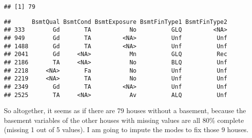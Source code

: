 \documentclass[]{article}
\newenvironment{Shaded}{\begin{snugshade}}{\end{snugshade}}
\newcommand{\CommentTok}[1]{\textcolor[rgb]{0.56,0.35,0.01}{\textit{#1}}}
\newcommand{\KeywordTok}[1]{\textcolor[rgb]{0.13,0.29,0.53}{\textbf{#1}}}
\newcommand{\NormalTok}[1]{#1}
\newcommand{\OperatorTok}[1]{\textcolor[rgb]{0.81,0.36,0.00}{\textbf{#1}}}
\newcommand{\StringTok}[1]{\textcolor[rgb]{0.31,0.60,0.02}{#1}}
\begin{document}
\begin{verbatim}
## [1] 79
\end{verbatim}

\begin{Shaded}
\end{Shaded}

\begin{verbatim}
##      BsmtQual BsmtCond BsmtExposure BsmtFinType1 BsmtFinType2
## 333        Gd       TA           No          GLQ         <NA>
## 949        Gd       TA         <NA>          Unf          Unf
## 1488       Gd       TA         <NA>          Unf          Unf
## 2041       Gd     <NA>           Mn          GLQ          Rec
## 2186       TA     <NA>           No          BLQ          Unf
## 2218     <NA>       Fa           No          Unf          Unf
## 2219     <NA>       TA           No          Unf          Unf
## 2349       Gd       TA         <NA>          Unf          Unf
## 2525       TA     <NA>           Av          ALQ          Unf
\end{verbatim}

So altogether, it seems as if there are 79 houses without a basement,
because the basement variables of the other houses with missing values
are all 80\% complete (missing 1 out of 5 values). I am going to impute
the modes to fix those 9 houses.
\end{document}
